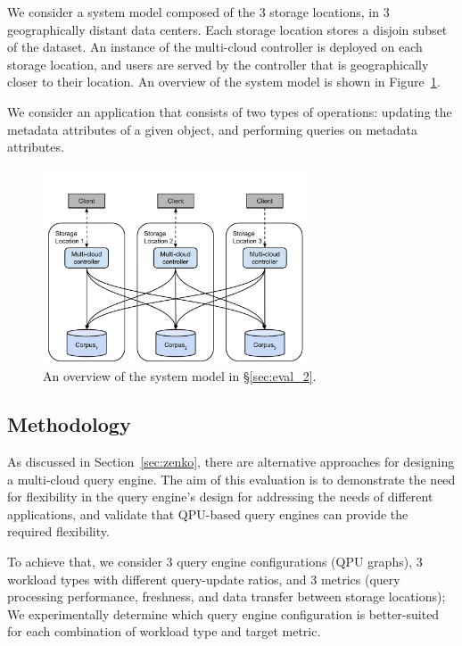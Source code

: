 We consider a system model composed of the 3 storage locations, in 3 geographically distant data
centers.
Each storage location stores a disjoin subset of the dataset.
An instance of the multi-cloud controller is deployed on each storage location,
and users are served by the controller that is geographically closer to their location.
An overview of the system model is shown in Figure~\ref{fig:eval_part2_overview}.

We consider an application that consists of two types of operations:
updating the metadata attributes of a given object,
and performing queries on metadata attributes.

\begin{figure}[H]
\centering
  \includegraphics[width=0.7\textwidth]{./figures/evaluation/eval_part2_overview.pdf}
  \caption{An overview of the system model in \S\ref{sec:eval_2}.}
  \label{fig:eval_part2_overview}
\end{figure}

\subsection{Methodology}

As discussed in Section~\ref{sec:zenko}, there are alternative approaches for designing a multi-cloud query engine.
The aim of this evaluation is to demonstrate the need for flexibility in the query engine's design for addressing the
needs of different applications,
and validate that QPU-based query engines can provide the required flexibility.

To achieve that, we consider 3 query engine configurations (QPU graphs), 3 workload types with different query-update ratios,
and 3 metrics (query processing performance, freshness, and data transfer between storage locations);
We experimentally determine which query engine configuration is better-suited for each combination of workload type and target metric.

